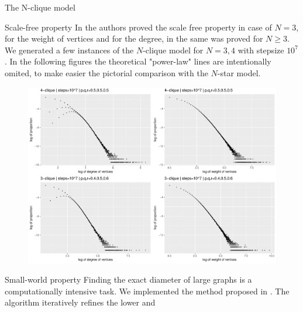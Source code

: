 \documentclass[final]{beamer}
\newlength{\onecolwid}
\newlength{\twocolwid}
\begin{document}
\begin{frame}[t]
\begin{columns}[t]
\begin{column}{\twocolwid}
\begin{columns}[t,totalwidth=\twocolwid]
\begin{column}{\onecolwid}
\begin{block}{The N-clique model}
\end{block}

\begin{block}{Scale-free property}\small
In \cite{BaMo} the authors proved the scale free property in case of $N=3$, for 
the weight of vertices and for the degree, in \cite{FaPo} the same was proved for 
$N\ge 3.$ We generated a few instances of the $N$-clique model for $N=3,4$ with stepsize 
$10^7$. In the following figures the theoretical "power-law" lines are intentionally omited, 
to make easier the pictorial comparison with the $N$-star model.
\vskip 2cm
\begin{figure}
\includegraphics[width=0.8\linewidth]{./fig/klikkdist4v.pdf}
\end{figure}
\end{block}

\begin{block}{Small-world property}\small
Finding the exact diameter of large graphs is a computationally intensive task. 
We implemented the method proposed in \cite{CreMa}. The algorithm iteratively 
refines the lower and
\end{block}

\end{column} %



\end{columns}
\end{column}
\end{columns}
\end{frame}
\end{document}
